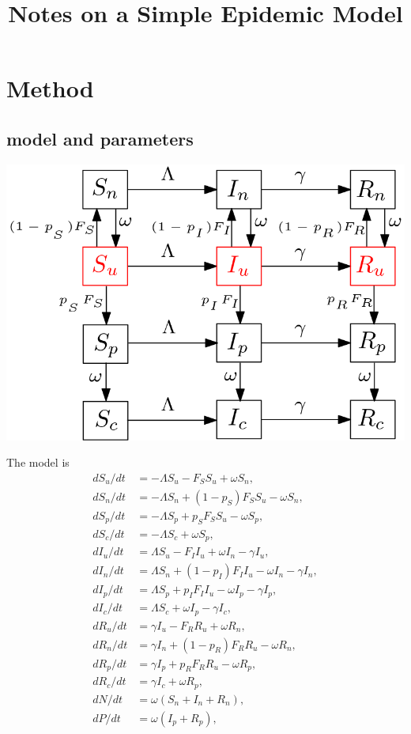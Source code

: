 \documentclass[12pt]{article}
\title{Notes on a Simple Epidemic Model }
\theoremstyle{definition} %
\begin{document}
\maketitle

\section{Method}

\subsection{model and parameters}
\includegraphics[width=0.5\linewidth]{../pix/sir_comp.png}

The model is
\begin{align}
 d S_u/dt &= -\Lambda S_u - F_S S_u + \omega S_n, \label{eq1}\\
 d S_n/dt &= -\Lambda S_n + (1-p_S) F_S S_u - \omega S_n, \label{eq2}\\
 d S_p/dt &= -\Lambda S_p + p_S F_S S_u - \omega S_p, \label{eq3}\\
 d S_c/dt &= -\Lambda S_c + \omega S_p, \label{eq4}\\
 d I_u/dt &= \Lambda S_u - F_I I_u + \omega I_n  - \gamma I_u,  \label{eq5}\\
 d I_n/dt &= \Lambda S_n + (1-p_I) F_I I_u - \omega I_n -\gamma I_n, \label{eq6}\\
 d I_p/dt &= \Lambda S_p + p_I F_I I_u - \omega I_p -\gamma I_p, \label{eq7}\\
 d I_c/dt &= \Lambda S_c + \omega I_p - \gamma I_c,  \label{eq8}\\
 d R_u/dt &= \gamma I_u - F_R R_u + \omega R_n, \label{eq9}\\
 d R_n/dt &= \gamma I_n + (1-p_R) F_R R_u - \omega R_n,  \label{eq10}\\
 d R_p/dt &= \gamma I_p + p_R F_R R_u  - \omega R_p,  \label{eq11}\\
 d R_c/dt&= \gamma I_c + \omega R_p,  \label{eq12}\\
 dN/dt &= \omega (S_n + I_n + R_n),   \label{eq13}\\
 dP/dt &= \omega(I_p + R_p) \label{eq14},
\end{align}
\end{document}
